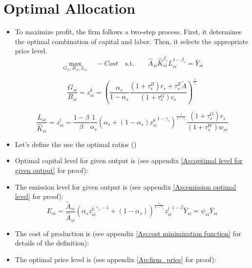 \documentclass[12pt]{article} %
\begin{document}
\section*{Optimal Allocation}
\begin{itemize}
    \item To maximize profit, the firm follows a two-step process. First, it determines the optimal combination of capital and labor. Then, it selects the appropriate price level.
    \begin{equation*}
        \max_{{G_{si},B_{si},L_{si}}}  \quad
            - 		Cost \quad \text{s.t.} \quad \quad \hat{A}_{si}\hat{K}_{si}^{\beta_s} L_{si}^{1-\beta_s} = \bar{Y}_{si}
    \end{equation*}

    \begin{equation}
        {\frac{G_{si}}{B_{si}} = {z_{si}^k}} {=  \left(
            \frac{\alpha_s}{1-\alpha_s} \frac{(1+{\tau_s^B})r_s + {\tau_s^E}\tilde{A}}{(1+{\tau_s^G})r_s}
        \right) ^{\frac{1}{\gamma_s}}}
    \end{equation}

    \begin{equation}
        {\frac{L_{si}}{\hat{K}_{si}} = {z_{si}^l}}
        { = \frac{1-\beta}{\beta}\frac{1}{\alpha_s}\left(
            \alpha_s + (1-\alpha_s) {{z_{si}^k}}^{1-\gamma_s}
        \right)^{\frac{1}{1-\gamma_s}} \frac{(1+{\tau_s^G})r_s}{(1+{\tau_s^W})w_{si}}}
    \end{equation}
  

    \item Let's define the use the optimal ratios ()
    
    \item Optimal capital level for given output is (see appendix \ref{Ap:optimal level for given output} for proof):
    

    \item The emission level for given output is (see appendix \ref{Ap:emission optimal level} for proof):
    \begin{equation}
        {E_{si} = \frac{\tilde{A}_{si}}{\hat{A}_{si}}\left(
            \alpha_s {{z_{si}^k}}^{\gamma_s - 1} + (1-\alpha_s)
        \right) ^ {\frac{\gamma_s}{1-\gamma_s}} {{z_{si}^l}}^{1 - \beta} \bar{Y}_{si} }
        {= {\psi_{si}}\bar{Y}_{si}}
    \end{equation}
    
    \item The cost of production is (see appendix \ref{Ap:cost minimization function} for details of the definition):
    
    
    \item The optimal price level is (see appendix \ref{Ap:firm_price} for proof):
    

\end{itemize}
\end{document}

